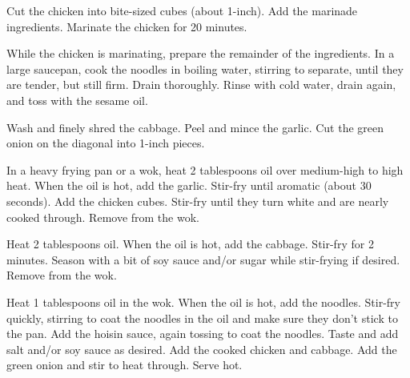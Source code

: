 Cut the chicken into bite-sized cubes (about 1-inch). Add the marinade ingredients. Marinate the chicken for 20 minutes.

While the chicken is marinating, prepare the remainder of the ingredients. In a large saucepan, cook the noodles in boiling water, stirring to separate, until they are tender, but still firm. Drain thoroughly. Rinse with cold water, drain again, and toss with the sesame oil.

Wash and finely shred the cabbage. Peel and mince the garlic. Cut the green onion on the diagonal into 1-inch pieces.

In a heavy frying pan or a wok, heat 2  tablespoons oil over medium-high to high heat. When the oil is hot, add the garlic. Stir-fry until aromatic (about 30 seconds). Add the chicken cubes. Stir-fry until they turn white and are nearly cooked through. Remove from the wok. 

Heat 2 tablespoons oil. When the oil is hot, add the cabbage. Stir-fry for 2 minutes. Season with a bit of soy sauce and/or sugar while stir-frying if desired. Remove from the wok.

Heat 1  tablespoons oil in the wok. When the oil is hot, add the noodles. Stir-fry quickly, stirring to coat the noodles in the oil and make sure they don't stick to the pan. Add the hoisin sauce, again tossing to coat the noodles. Taste and add salt and/or soy sauce as desired. Add the cooked chicken and cabbage. Add the green onion and stir to heat through. Serve hot.